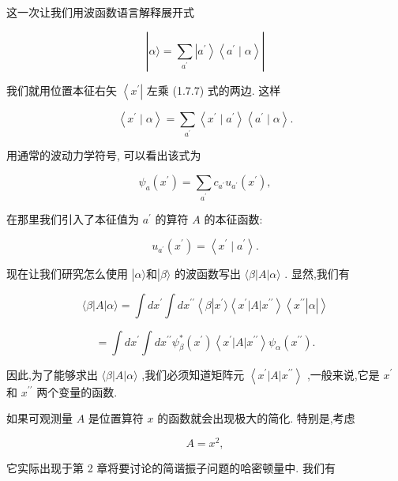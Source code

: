 \documentclass[lang=cn,newtx,10pt,scheme=chinese,thmcnt=section]{elegantbook}
\begin{document}
这一次让我们用波函数语言解释展开式

$$
\left| {\alpha \rangle = \mathop{\sum }\limits_{{a}^{\prime }}\left| {a}^{\prime }\right\rangle \left\langle {{a}^{\prime } \mid \alpha }\right\rangle }\right| \tag{1.7.7}
$$

我们就用位置本征右矢 $\left\langle {x}^{\prime }\right|$ 左乘 (1.7.7) 式的两边. 这样

$$
\left\langle {{x}^{\prime } \mid \alpha }\right\rangle = \mathop{\sum }\limits_{{a}^{\prime }}\left\langle {{x}^{\prime } \mid {a}^{\prime }}\right\rangle \left\langle {{a}^{\prime } \mid \alpha }\right\rangle . \tag{1.7.8}
$$

用通常的波动力学符号, 可以看出该式为

$$
{\psi }_{a}\left( {x}^{\prime }\right) = \mathop{\sum }\limits_{{a}^{\prime }}{c}_{{a}^{\prime }}{u}_{{a}^{\prime }}\left( {x}^{\prime }\right) ,
$$

在那里我们引入了本征值为 ${a}^{\prime }$ 的算符 $A$ 的本征函数:

$$
{u}_{{a}^{\prime }}\left( {x}^{\prime }\right) = \left\langle {{x}^{\prime } \mid {a}^{\prime }}\right\rangle . \tag{1.7.9}
$$

现在让我们研究怎么使用 $\left| {\alpha \rangle \text{和}}\right| \beta \rangle$ 的波函数写出 $\langle \beta \left| A\right| \alpha \rangle$ . 显然,我们有

$$
\langle \beta \left| A\right| \alpha \rangle = \int d{x}^{\prime }\int d{x}^{\prime \prime }\left\langle {\beta \left| {{x}^{\prime }\rangle \left\langle {{x}^{\prime }\left| A\right| {x}^{\prime \prime }}\right\rangle \left\langle {x}^{\prime \prime }\right| \alpha }\right| }\right\rangle \tag{1.7.10}
$$

$$
= \int d{x}^{\prime }\int d{x}^{\prime \prime }{\psi }_{\beta }^{ * }\left( {x}^{\prime }\right) \left\langle {{x}^{\prime }\left| A\right| {x}^{\prime \prime }}\right\rangle {\psi }_{\alpha }\left( {x}^{\prime \prime }\right) .
$$

因此,为了能够求出 $\langle \beta \left| A\right| \alpha \rangle$ ,我们必须知道矩阵元 $\left\langle {{x}^{\prime }\left| A\right| {x}^{\prime \prime }}\right\rangle$ ,一般来说,它是 ${x}^{\prime }$ 和 ${x}^{\prime \prime }$ 两个变量的函数.

如果可观测量 $A$ 是位置算符 $x$ 的函数就会出现极大的简化. 特别是,考虑

$$
A = {x}^{2}, \tag{1. 7.11}
$$

它实际出现于第 2 章将要讨论的简谐振子问题的哈密顿量中. 我们有
\end{document}
